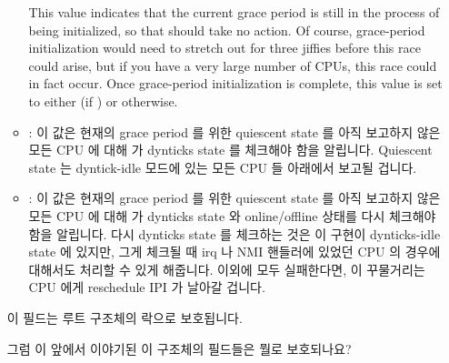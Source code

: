 \begin{itemize}
\begin{itemize}
		This value indicates that the current grace period
		is still in the process of being initialized,
		so that  should take
		no action.
		Of course, grace-period initialization would need
		to stretch out for three jiffies before this race
		could arise, but if you have a very large number
		of CPUs, this race could in fact occur.
		Once grace-period initialization is complete,
		this value is set to either 
		(if ) or  otherwise.
		\fi
	\item	{}:
		이 값은 현재의 grace period 를 위한 quiescent state 를 아직
		보고하지 않은 모든 CPU 에 대해  가
		dynticks state 를 체크해야 함을 알립니다.
		Quiescent state 는 dyntick-idle 모드에 있는 모든 CPU 들
		아래에서 보고될 겁니다.
		\iffalse

		This value indicates that \co{force_quiescent_state()}
		should check the dynticks state of any CPUs that have
		not yet reported quiescent states for the current
		grace period.
		Quiescent states will be reported on behalf of any
		CPUs that are in dyntick-idle mode.
		\fi
	\item	{}:
		이 값은 현재의 grace period 를 위한 quiescent state 를 아직
		보고하지 않은 모든 CPU 에 대해  가
		dynticks state 와 online/offline 상태를 다시 체크해야 함을
		알립니다.
		다시 dynticks state 를 체크하는 것은 이 구현이 dynticks-idle
		state 에 있지만, 그게 체크될 때 irq 나 NMI 핸들러에 있었던 CPU
		의 경우에 대해서도 처리할 수 있게 해줍니다.
		이외에 모두 실패한다면, 이 꾸물거리는 CPU 에게 reschedule IPI
		가 날아갈 겁니다.
		\iffalse

		This value indicates that \co{force_quiescent_state()}
		should recheck dynticks state along with the online/offline
		state of any CPUs that have
		not yet reported quiescent states for the current
		grace period.
		The rechecking of dynticks states allows the implementation
		to handle cases where a given CPU might be in dynticks-idle
		state, but have been in an irq or NMI handler both
		times it was checked.
		If all else fails, a reschedule IPI will be sent to
		the laggard CPU.
		\fi
	\end{itemize}
	이 필드는 루트  구조체의 락으로 보호됩니다.
	\iffalse

	This field is guarded by the root \co{rcu_node} structure's lock.
	\fi

\QuickQuiz{}
	그럼 이 앞에서 이야기된 이 구조체의 필드들은 뭘로 보호되나요?
	\iffalse


\end{itemize}
